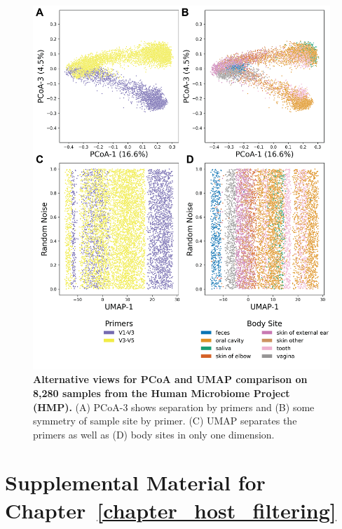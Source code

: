 \begin{figure}[htbp]
\centering
\includegraphics[width=\textwidth]{umap-figures/figureS03.png}
\caption[ Alternative views for PCoA and UMAP comparison on 8,280 samples from the Human Microbiome Project (HMP).]{\textbf{ Alternative views for PCoA and UMAP comparison on 8,280 samples from the Human Microbiome Project (HMP).} (A) PCoA-3 shows separation by primers and (B) some symmetry of sample site by primer. (C) UMAP separates the primers as well as (D) body sites in only one dimension.}
\label{umap_figS3}
\end{figure}


\chapter{Supplemental Material for Chapter~\ref{chapter_host_filtering}}

